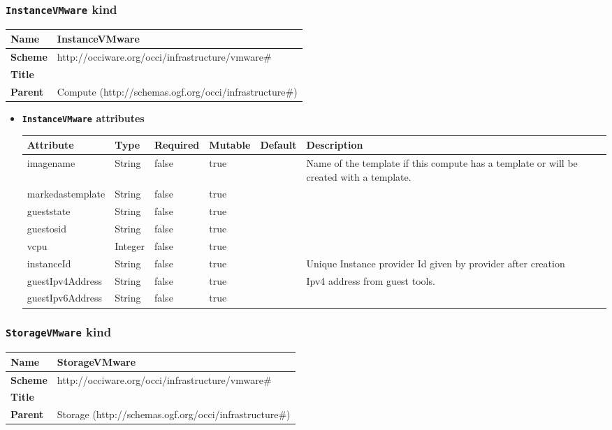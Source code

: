 \subsubsection{\texttt{InstanceVMware} kind}
\begin{center}
\begin{tabular}{|l|l|}
  \hline
  \textbf{Name} & InstanceVMware \\
  \hline  
  \textbf{Scheme} & http://occiware.org/occi/infrastructure/vmware\# \\
  \hline
  \textbf{Title} &  \\
  \hline
  \textbf{Parent} & Compute (http://schemas.ogf.org/occi/infrastructure\#) \\
  \hline
\end{tabular}
\end{center}
\begin{itemize}
\item \textbf{\texttt{InstanceVMware} attributes}

\begin{tabularx}{\textwidth}{|l|l|p{1.4cm}|p{1.3cm}|l|X|}
  \hline
  \textbf{Attribute} & \textbf{Type} & \textbf{Required} & \textbf{Mutable} & \textbf{Default} & \textbf{Description} \\
  \hline  
  imagename & String & false & true &  & Name of the template if this compute has a template or will be created with a template. \\
  \hline
  markedastemplate & String & false & true &  &  \\
  \hline
  gueststate & String & false & true &  &  \\
  \hline
  guestosid & String & false & true &  &  \\
  \hline
  vcpu & Integer & false & true &  &  \\
  \hline
  instanceId & String & false & true &  & Unique Instance provider Id given by provider after creation \\
  \hline
  guestIpv4Address & String & false & true &  & Ipv4 address from guest tools. \\
  \hline
  guestIpv6Address & String & false & true &  &  \\
  \hline
\end{tabularx}
\end{itemize}



\subsubsection{\texttt{StorageVMware} kind}
\begin{center}
\begin{tabular}{|l|l|}
  \hline
  \textbf{Name} & StorageVMware \\
  \hline  
  \textbf{Scheme} & http://occiware.org/occi/infrastructure/vmware\# \\
  \hline
  \textbf{Title} &  \\
  \hline
  \textbf{Parent} & Storage (http://schemas.ogf.org/occi/infrastructure\#) \\
  \hline
\end{tabular}
\end{center}




